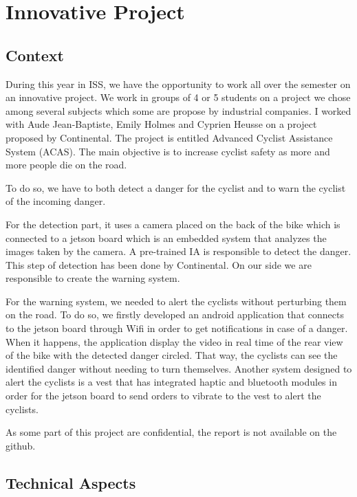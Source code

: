 \section{Innovative Project}

\subsection{Context}

During this year in ISS, we have the opportunity to work all over the semester on an innovative project. We work in groups of 4 or 5 students on a project we chose among several subjects which some are propose by industrial companies. I worked with Aude Jean-Baptiste, Emily Holmes and Cyprien Heusse on a project proposed by Continental. The project is entitled Advanced Cyclist Assistance System (ACAS). The main objective is to increase cyclist safety as more and more people die on the road. \par
To do so, we have to both detect a danger for the cyclist and to warn the cyclist of the incoming danger.
\\\par
For the detection part, it uses a camera placed on the back of the bike which is connected to a jetson board which is an embedded system that analyzes the images taken by the camera. A pre-trained IA is responsible to detect the danger. This step of detection has been done by Continental. On our side we are responsible to create the warning system.
\\\par
For the warning system, we needed to alert the cyclists without perturbing them on the road. To do so, we firstly developed an android application that connects to the jetson board through Wifi in order to get notifications in case of a danger. When it happens, the application display the video in real time of the rear view of the bike with the detected danger circled. That way, the cyclists can see the identified danger without needing to turn themselves. Another system designed to alert the cyclists is a vest that has integrated haptic and bluetooth modules in order for the jetson board to send orders to vibrate to the vest to alert the cyclists.
\\\par

As some part of this project are confidential, the report is not available on the github.

\subsection{Technical Aspects}

